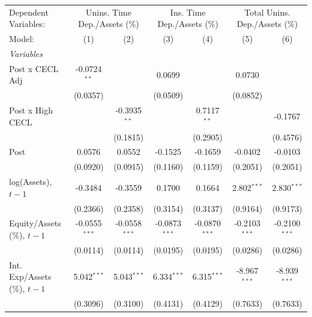 
\begingroup
\centering
\begin{tabular}{lcccccc}
   \tabularnewline \midrule \midrule
   Dependent Variables: & \multicolumn{2}{c}{Unins. Time Dep./Assets (\%)} & \multicolumn{2}{c}{Ins. Time Dep./Assets (\%)} & \multicolumn{2}{c}{Total Unins. Dep./Assets (\%)}\\
   Model:                         & (1)             & (2)             & (3)             & (4)             & (5)             & (6)\\  
   \midrule
   \emph{Variables}\\
   Post x CECL Adj                & -0.0724$^{**}$  &                 & 0.0699          &                 & 0.0730          &   \\   
                                  & (0.0357)        &                 & (0.0509)        &                 & (0.0852)        &   \\   
   Post x High CECL               &                 & -0.3935$^{**}$  &                 & 0.7117$^{**}$   &                 & -0.1767\\   
                                  &                 & (0.1815)        &                 & (0.2905)        &                 & (0.4576)\\   
   Post                           & 0.0576          & 0.0552          & -0.1525         & -0.1659         & -0.0402         & -0.0103\\   
                                  & (0.0920)        & (0.0915)        & (0.1160)        & (0.1159)        & (0.2051)        & (0.2051)\\   
   log(Assets), $t{-}1$           & -0.3484         & -0.3559         & 0.1700          & 0.1664          & 2.802$^{***}$   & 2.830$^{***}$\\   
                                  & (0.2366)        & (0.2358)        & (0.3154)        & (0.3137)        & (0.9164)        & (0.9173)\\   
   Equity/Assets (\%), $t{-}1$    & -0.0555$^{***}$ & -0.0558$^{***}$ & -0.0873$^{***}$ & -0.0870$^{***}$ & -0.2103$^{***}$ & -0.2100$^{***}$\\   
                                  & (0.0114)        & (0.0114)        & (0.0195)        & (0.0195)        & (0.0286)        & (0.0286)\\   
   Int. Exp/Assets (\%), $t{-}1$  & 5.042$^{***}$   & 5.043$^{***}$   & 6.334$^{***}$   & 6.315$^{***}$   & -8.967$^{***}$  & -8.939$^{***}$\\   
                                  & (0.3096)        & (0.3100)        & (0.4131)        & (0.4129)        & (0.7633)        & (0.7633)\\   

\end{tabular}
